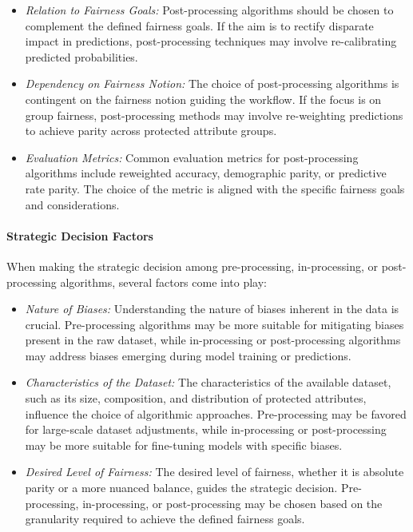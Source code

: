 \begin{itemize}

    \item \emph{Relation to Fairness Goals:} Post-processing algorithms should be chosen to complement the defined fairness goals. If the aim is to rectify disparate impact in predictions, post-processing techniques may involve re-calibrating predicted probabilities.

    \item \emph{Dependency on Fairness Notion:} The choice of post-processing algorithms is contingent on the fairness notion guiding the workflow. If the focus is on group fairness, post-processing methods may involve re-weighting predictions to achieve parity across protected attribute groups.

    \item \emph{Evaluation Metrics:} Common evaluation metrics for post-processing algorithms include reweighted accuracy, demographic parity, or predictive rate parity. The choice of the metric is aligned with the specific fairness goals and considerations.

\end{itemize}

\paragraph{Strategic Decision Factors}

When making the strategic decision among pre-processing, in-processing, or post-processing algorithms, several factors come into play:

\begin{itemize}
    \item \emph{Nature of Biases:} Understanding the nature of biases inherent in the data is crucial. Pre-processing algorithms may be more suitable for mitigating biases present in the raw dataset, while in-processing or post-processing algorithms may address biases emerging during model training or predictions.

    \item \emph{Characteristics of the Dataset:} The characteristics of the available dataset, such as its size, composition, and distribution of protected attributes, influence the choice of algorithmic approaches. Pre-processing may be favored for large-scale dataset adjustments, while in-processing or post-processing may be more suitable for fine-tuning models with specific biases.

    \item \emph{Desired Level of Fairness:} The desired level of fairness, whether it is absolute parity or a more nuanced balance, guides the strategic decision. Pre-processing, in-processing, or post-processing may be chosen based on the granularity required to achieve the defined fairness goals.

\end{itemize}

